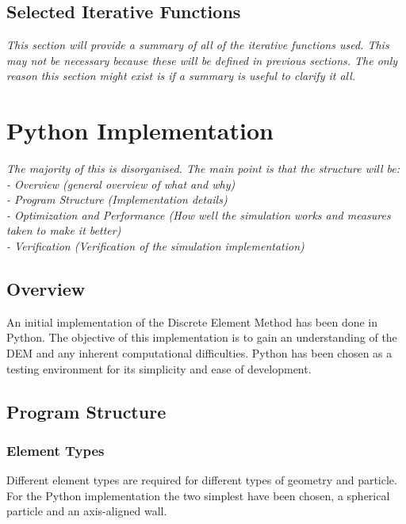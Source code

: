\documentclass[10pt,a4paper,titlepage]{report}
\begin{document}
\section{Selected Iterative Functions}
\textit{This section will provide a summary of all of the iterative functions used. This may not be necessary because these will be defined in previous sections. The only reason this section might exist is if a summary is useful to clarify it all.}
\chapter{Python Implementation}
\textit{The majority of this is disorganised. The main point is that the structure will be:
\\- Overview (general overview of what and why)
\\- Program Structure (Implementation details)
\\- Optimization and Performance (How well the simulation works and measures taken to make it better)
\\- Verification (Verification of the simulation implementation)}
\label{ch:Python Implementation}
\section{Overview}
An initial implementation of the Discrete Element Method has been done in Python. The objective of this implementation is to gain an understanding of the DEM and any inherent computational difficulties. Python has been chosen as a testing environment for its simplicity and ease of development. 
\section{Program Structure}
\subsection{Element Types}
Different element types are required for different types of geometry and particle. For the Python implementation the two simplest have been chosen, a spherical particle and an axis-aligned wall.
\end{document}
